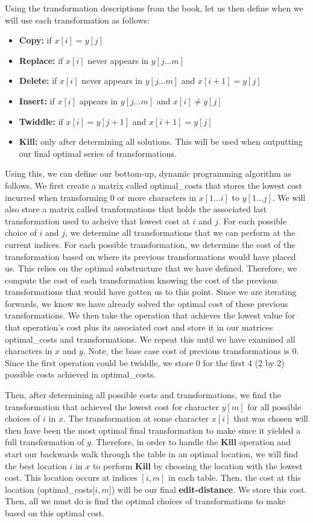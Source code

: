 \documentclass[11pt]{article}
\begin{document}
Using the transformation descriptions from the book, let us then define when we will use each transformation as follows:
\begin{itemize}
  \item \textbf{Copy:} if $x[i] = y[j]$
  \item \textbf{Replace:} if $x[i]$ never appears in $y[j...m]$
  \item \textbf{Delete:} if $x[i]$ never appears in $y[j...m]$ and $x[i+1] = y[j]$
  \item \textbf{Insert:} if $x[i]$ appears in $y[j...m]$ and $x[i] \neq y[j]$
  \item \textbf{Twiddle:} if $x[i] = y[j+1]$ and $x[i+1] = y[j]$
  \item \textbf{Kill:} only after determining all solutions. This will be used when outputting our final optimal series of transformations.
\end{itemize}

Using this, we can define our bottom-up, dynamic programming algorithm as follows. We first create a matrix called optimal\_costs that stores the lowest cost incurred when transforming 0 or more characters in $x[1...i]$ to $y[1...j]$. We will also store a matrix called tranformations that holds the associated last transformation used to acheive that lowest cost at $i$ and $j$. For each possible choice of $i$ and $j$, we determine all transformations that we can perform at the current indices. For each possible transformation, we determine the cost of the transformation based on where its previous transformations would have placed us. This relies on the optimal substructure that we have defined. Therefore, we compute the cost of each transformation knowing the cost of the previous transformations that would have gotten us to this point. Since we are iterating forwards, we know we have already solved the optimal cost of these previous transformations. We then take the operation that achieves the lowest value for that operation's cost plus its associated cost and store it in our matrices optimal\_costs and transformations. We repeat this until we have examined all characters in $x$ and $y$. Note, the base case cost of previous transformations is 0. Since the first operation could be twiddle, we store 0 for the first 4 (2 by 2) possible costs achieved in optimal\_costs.

Then, after determining all possible costs and transformations, we find the transformation that achieved the lowest cost for character $y[m]$ for all possible choices of $i$ in $x$. The transformation at some character $x[i]$ that was chosen will then have been the most optimal final transformation to make since it yielded a full transformation of $y$. Therefore, in order to handle the \textbf{Kill} operation and start our backwards walk through the table in an optimal location, we will find the best location $i$ in $x$ to perform \textbf{Kill} by choosing the location with the lowest cost. This location occurs at indices $[i,m]$ in each table. Then, the cost at this location (optimal\_costs[$i,m$]) will be our final \textbf{edit-distance}. We store this cost. Then, all we must do is find the optimal choices of transformations to make based on this optimal cost.
\end{document}
